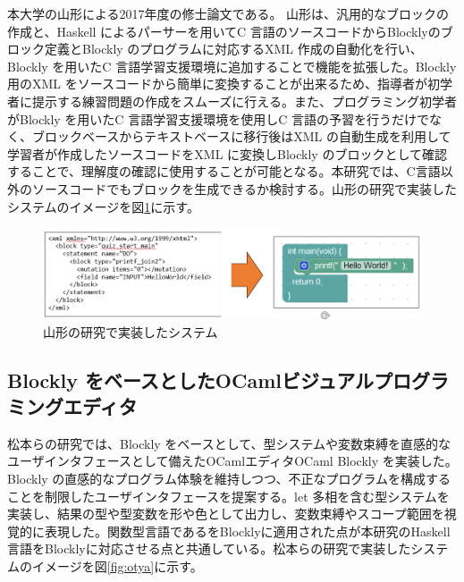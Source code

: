 \documentclass{risepaper}
\begin{document}
  本大学の山形による2017年度の修士論文\cite{yamagata, yamagata2}である。
 山形は、汎用的なブロックの作成と、Haskell によるパーサーを用いてC 言語のソースコードからBlocklyのブロック定義とBlockly のプログラムに対応するXML 作成の自動化を行い、Blockly を用いたC 言語学習支援環境に追加することで機能を拡張した。Blockly 用のXML をソースコードから簡単に変換することが出来るため、指導者が初学者に提示する練習問題の作成をスムーズに行える。また、プログラミング初学者がBlockly を用いたC 言語学習支援環境を使用しC 言語の予習を行うだけでなく、ブロックベースからテキストベースに移行後はXML の自動生成を利用して学習者が作成したソースコードをXML に変換しBlockly のブロックとして確認することで、理解度の確認に使用することが可能となる。本研究では、C言語以外のソースコードでもブロックを生成できるか検討する。山形の研究で実装したシステムのイメージを図\ref{fig:yamagata}に示す。 
 
\begin{figure}[h]
\begin{center}
\includegraphics[scale=0.8]{img/yamagata.PNG}
\caption{山形の研究で実装したシステム}%
\label{fig:yamagata}
\end{center}%
\end{figure}%

	\subsection{Blockly をベースとしたOCamlビジュアルプログラミングエディタ}
    
松本らの研究\cite{otya}では、Blockly をベースとして、型システムや変数束縛を直感的なユーザインタフェースとして備えたOCamlエディタOCaml Blockly を実装した。Blockly の直感的なプログラム体験を維持しつつ、不正なプログラムを構成することを制限したユーザインタフェースを提案する。let 多相を含む型システムを実装し、結果の型や型変数を形や色として出力し、変数束縛やスコープ範囲を視覚的に表現した。関数型言語であるをBlocklyに適用された点が本研究のHaskell言語をBlocklyに対応させる点と共通している。松本らの研究で実装したシステムのイメージを図\ref{fig:otya}に示す。 
\end{document}
